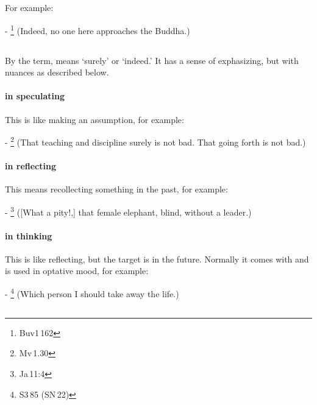 \subsection*{}\label{nip:assu}
For example:\par
- \footnote{Buv1\,162} (Indeed, no one here approaches the Buddha.) \par

\subsection*{}\label{nip:nuuna}
By the term,  means `surely' or `indeed.' It has a sense of exphasizing, but with nuances as described below.\par
\paragraph*{ in speculating} This is like making an assumption, for example:\par
- \footnote{Mv\,1.30} (That teaching and discipline surely is not bad. That going forth is not bad.) \par
\paragraph*{ in reflecting} This means recollecting something in the past, for example:\par
- \footnote{Ja\,11:4} ([What a pity!,] that female elephant, blind, without a leader.) \par
\paragraph*{ in thinking} This is like reflecting, but the target is in the future. Normally it comes with  and is used in optative mood, for example:\par
- \footnote{S3\,85 (SN\,22)} (Which person I should take away the life.) \par

\subsection*{}\label{nip:vata}
